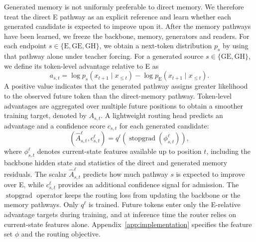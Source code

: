 \documentclass{article}
\begin{document}
Generated memory is not uniformly preferable to direct memory.
We therefore treat the direct E pathway as an explicit reference and learn
whether each generated candidate is expected to improve upon it.
%
After the memory pathways have been learned, we freeze the backbone, memory,
generators and readers.
For each endpoint
$s \in \{\mathrm{E},\mathrm{GE},\mathrm{GH}\}$,
we obtain a next-token distribution $p_s$ by using that pathway alone under
teacher forcing.
%
For a generated source
$s \in \{\mathrm{GE},\mathrm{GH}\}$,
we define its token-level advantage relative to E as
\begin{equation}
a_{s,t}
=
\log p_s
\left(
x_{t+1} \mid x_{\leq t}
\right)
-
\log p_{\mathrm{E}}
\left(
x_{t+1} \mid x_{\leq t}
\right).
\label{eq:token_advantage}
\end{equation}
%
A positive value indicates that the generated pathway assigns greater
likelihood to the observed future token than the direct-memory pathway.
Token-level advantages are aggregated over multiple future positions to
obtain a smoother training target, denoted by $A_{s,t}$.
%
A lightweight routing head predicts an advantage and a confidence score $c_{s,t}$ for
each generated candidate:
\begin{equation}
\left(
\widehat{A}_{s,t}^{\ell},
c_{s,t}^{\ell}
\right)
=
q^\ell
\left(
\operatorname{stopgrad}
\left(
\phi_{s,t}^{\ell}
\right)
\right),
\label{eq:router_prediction}
\end{equation}
where $\phi_{s,t}^{\ell}$ denotes current-state features available up to position $t$, including the backbone hidden state and statistics of the direct and generated memory residuals. The scalar $\widehat{A}_{s,t}^{\ell}$ predicts how much pathway $s$ is expected to improve over E, while $c_{s,t}^{\ell}$ provides an additional confidence signal for admission. The $\operatorname{stopgrad}$ operator keeps the routing loss from updating the backbone or the memory pathways. Only $q^\ell$ is trained. Future tokens enter only the E-relative advantage targets during training, and at inference time the router relies on current-state features alone. Appendix~\ref{app:implementation} specifies the feature set $\phi$ and the routing objective.
\end{document}

